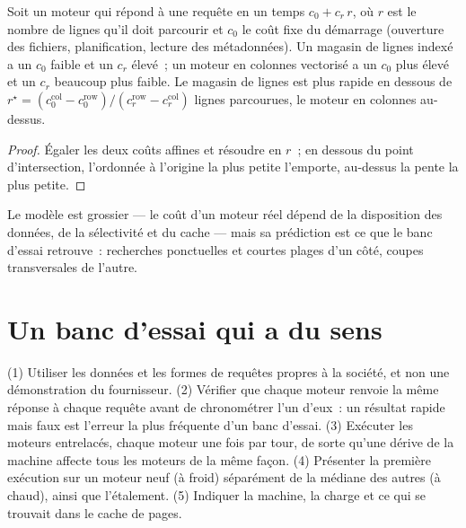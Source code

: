 \begin{proposition}\label{prop:pl:time-series-databases-and-the-alternatives:shapes}
Soit un moteur qui répond à une requête en un temps $c_0 + c_r\,r$, où $r$ est le nombre de lignes qu'il doit parcourir et $c_0$ le coût fixe du
démarrage (ouverture des fichiers, planification, lecture des métadonnées). Un magasin de lignes indexé a un $c_0$ faible et un $c_r$ élevé~; un moteur en colonnes vectorisé
a un $c_0$ plus élevé et un $c_r$ beaucoup plus faible. Le magasin de lignes est plus rapide en dessous de $r^\star = (c_0^{\mathrm{col}} -
c_0^{\mathrm{row}})/(c_r^{\mathrm{row}} - c_r^{\mathrm{col}})$ lignes parcourues, le moteur en colonnes au-dessus.
\end{proposition}

\begin{proof}
Égaler les deux coûts affines et résoudre en $r$~; en dessous du point d'intersection, l'ordonnée à l'origine la plus petite l'emporte, au-dessus la pente la plus petite.
\end{proof}

Le modèle est grossier --- le coût d'un moteur réel dépend de la disposition des données, de la sélectivité et du cache --- mais sa prédiction est ce que le banc d'essai
retrouve~: recherches ponctuelles et courtes plages d'un côté, coupes transversales de l'autre.

\section{Un banc d'essai qui a du sens}

\begin{method}\label{met:pl:time-series-databases-and-the-alternatives:bench}
(1) Utiliser les données et les formes de requêtes propres à la société, et non une démonstration du fournisseur. (2) Vérifier que chaque moteur renvoie la même réponse
à chaque requête avant de chronométrer l'un d'eux~: un résultat rapide mais faux est l'erreur la plus fréquente d'un banc d'essai. (3) Exécuter les moteurs entrelacés,
chaque moteur une fois par tour, de sorte qu'une dérive de la machine affecte tous les moteurs de la même façon. (4) Présenter la première exécution sur un moteur neuf (à froid)
séparément de la médiane des autres (à chaud), ainsi que l'étalement. (5) Indiquer la machine, la charge et ce qui se trouvait dans le cache de pages.
\end{method}

